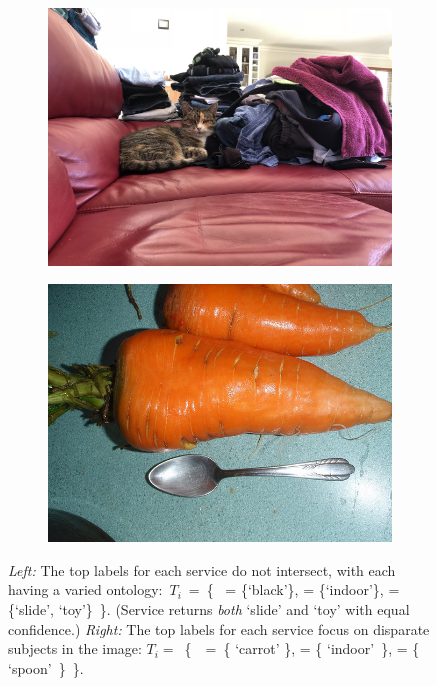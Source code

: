 \begin{figure}[t]
  \centering
  \begin{subfigure}[b]{0.49\linewidth}
    \centering
    \includegraphics[width=.8\linewidth]{cat_1}  
    \caption{}
    \label{icsme2019:fig:sample-images:cat}
  \end{subfigure}
  \hfill
  \begin{subfigure}[b]{0.49\linewidth}
    \centering
    \includegraphics[width=.8\linewidth]{000000196009} 
    \caption{}
    \label{icsme2019:fig:sample-images:carrot}
  \end{subfigure}
  \caption[Top labels for images between computer vision services do not intersect]{
    \textit{Left:} The top labels for each service do not intersect, with each having a varied ontology:~$T_{i}$~=~\{~\googleapi{} = \{`black'\}, \azureapi{} = \{`indoor'\}, \awsapi{} = \{`slide', `toy'\}~\}. (Service \awsapi{} returns \textit{both} `slide' and `toy' with equal confidence.)
    \textit{Right:} The top labels for each service focus on disparate subjects in the image: $T_{i} = $~\{~\googleapi{}~=~\{ `carrot' \}, \azureapi{} = \{ `indoor'~\}, \awsapi{} = \{ `spoon'~\}~\}.
    }
\end{figure}

